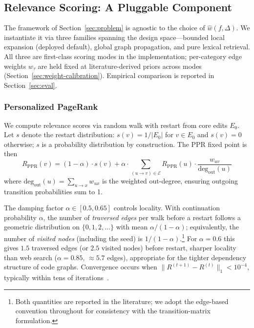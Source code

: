 \documentclass[11pt, a4paper]{article}
\begin{document}
\subsection{Relevance Scoring: A Pluggable Component}
\label{sec:scoring}

The framework of Section~\ref{sec:problem} is agnostic to the choice of $\hat{w}(f, \Delta)$. We instantiate it via three families spanning the design space---bounded local expansion (deployed default), global graph propagation, and pure lexical retrieval. All three are first-class scoring modes in the implementation; per-category edge weights $w_\tau$ are held fixed at literature-derived priors across modes (Section~\ref{sec:weight-calibration}). Empirical comparison is reported in Section~\ref{sec:eval}.

\subsubsection{Personalized PageRank}
\label{sec:ppr}

We compute relevance scores via random walk with restart from core edits $E_0$. Let $s$ denote the restart distribution: $s(v) = 1/|E_0|$ for $v \in E_0$ and $s(v) = 0$ otherwise; $s$ is a probability distribution by construction. The PPR fixed point is then
\begin{equation}
    R_{\mathrm{PPR}}(v) = (1-\alpha) \cdot s(v) + \alpha \cdot \sum_{(u \to v) \in \mathcal{E}} R_{\mathrm{PPR}}(u) \cdot \frac{w_{uv}}{\text{deg}_{\text{out}}(u)}
\end{equation}
where $\text{deg}_{\text{out}}(u) = \sum_{u \to x} w_{ux}$ is the weighted out-degree, ensuring outgoing transition probabilities sum to 1.

The damping factor $\alpha \in [0.5, 0.65]$ controls locality. With continuation probability $\alpha$, the number of \emph{traversed edges} per walk before a restart follows a geometric distribution on $\{0, 1, 2, \ldots\}$ with mean $\alpha / (1 - \alpha)$; equivalently, the number of \emph{visited nodes} (including the seed) is $1/(1-\alpha)$.\footnote{Both quantities are reported in the literature; we adopt the edge-based convention throughout for consistency with the transition-matrix formulation.} For $\alpha = 0.6$ this gives $1.5$ traversed edges (or $2.5$ visited nodes) before restart, sharper locality than web search ($\alpha = 0.85$, $\approx 5.7$ edges), appropriate for the tighter dependency structure of code graphs. Convergence occurs when $\|R^{(t+1)} - R^{(t)}\|_1 < 10^{-4}$, typically within tens of iterations~\cite{lofgren2014fast}.
\end{document}
